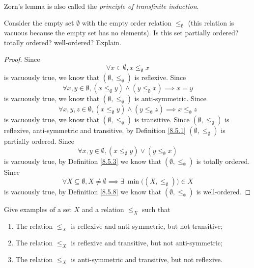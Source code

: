 \begin{note}
    Zorn's lemma is also called the \emph{principle of transfinite induction}.
\end{note}

\exercisesection

\begin{exercise}\label{ex 8.5.1}
    Consider the empty set \(\emptyset\) with the empty order relation \(\leq_\emptyset\)
    (this relation is vacuous because the empty set has no elements).
    Is this set partially ordered? totally ordered? well-ordered? Explain.
\end{exercise}

\begin{proof}
    Since
    \[
        \forall x \in \emptyset, x \leq_{\emptyset} x
    \]
    is vacuously true, we know that \((\emptyset, \leq_{\emptyset})\) is reflexive.
    Since
    \[
        \forall x, y \in \emptyset, (x \leq_{\emptyset} y) \land (y \leq_{\emptyset} x) \implies x = y
    \]
    is vacuously true, we know that \((\emptyset, \leq_{\emptyset})\) is anti-symmetric.
    Since
    \[
        \forall x, y, z \in \emptyset, (x \leq_{\emptyset} y) \land (y \leq_{\emptyset} z) \implies x \leq_{\emptyset} z
    \]
    is vacuously true, we know that \((\emptyset, \leq_{\emptyset})\) is transitive.
    Since \((\emptyset, \leq_{\emptyset})\) is reflexive, anti-symmetric and transitive, by Definition \ref{8.5.1} \((\emptyset, \leq_{\emptyset})\) is partially ordered.
    Since
    \[
        \forall x, y \in \emptyset, (x \leq_{\emptyset} y) \lor (y \leq_{\emptyset} x)
    \]
    is vacuously true, by Definition \ref{8.5.3} we know that \((\emptyset, \leq_{\emptyset})\) is totally ordered.
    Since
    \[
        \forall X \subseteq \emptyset, X \neq \emptyset \implies \exists\ \min\big((X, \leq_{\emptyset})\big) \in X
    \]
    is vacuously true, by Definition \ref{8.5.8} we know that \((\emptyset, \leq_{\emptyset})\) is well-ordered.
\end{proof}

\begin{exercise}\label{ex 8.5.2}
    Give examples of a set \(X\) and a relation \(\leq_X\) such that
    \begin{enumerate}
        \item The relation \(\leq_X\) is reflexive and anti-symmetric, but not transitive;
        \item The relation \(\leq_X\) is reflexive and transitive, but not anti-symmetric;
        \item The relation \(\leq_X\) is anti-symmetric and transitive, but not reflexive.
    \end{enumerate}
\end{exercise}

